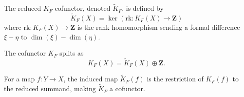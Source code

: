 The reduced $K_F$ cofunctor, denoted $\tilde{K}_F$, is defined by
$$
\tilde{K}_F(X) = \ker(\text{rk}: K_F(X) \to \mathbf{Z})
$$
where $\text{rk}: K_F(X) \to \mathbf{Z}$ is the rank homomorphism sending a formal difference $\xi - \eta$ to $\dim(\xi) - \dim(\eta)$.

The cofunctor $K_F$ splits as
$$
K_F(X) = \tilde{K}_F(X) \oplus \mathbf{Z}.
$$

For a map $f: Y \to X$, the induced map $\tilde{K}_F(f)$ is the restriction of $K_F(f)$ to the reduced summand, making $\tilde{K}_F$ a cofunctor.
